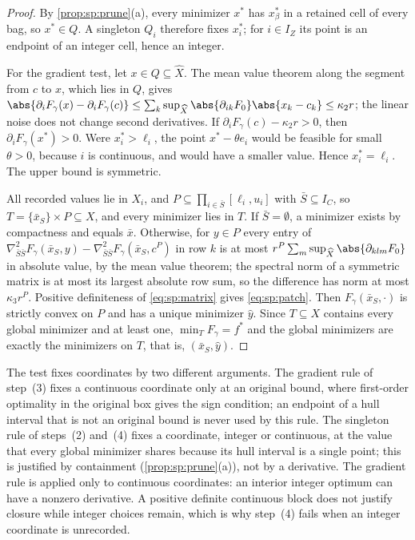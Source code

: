 \begin{proof}
By \cref{prop:sp:prune}(a), every minimizer $x^*$ has $x^*_\beta$ in a
retained cell of every bag, so $x^*\in Q$. A singleton $Q_i$ therefore fixes
$x_i^*$; for $i\in I_Z$ its point is an endpoint of an integer cell, hence an
integer.

For the gradient test, let $x\in Q\subseteq\widehat X$. The mean value
theorem along the segment from $c$ to $x$, which lies in $Q$, gives
$\abs{\partial_iF_\gamma(x)-\partial_iF_\gamma(c)}\le\sum_k\sup_{\widehat X}
\abs{\partial_{ik}F_0}\abs{x_k-c_k}\le\kappa_2r$; the linear noise does not
change second derivatives. If $\partial_iF_\gamma(c)-\kappa_2r>0$, then
$\partial_iF_\gamma(x^*)>0$. Were $x^*_i>\ell_i$, the point
$x^*-\theta e_i$ would be feasible for small $\theta>0$, because $i$ is
continuous, and would have a smaller value. Hence $x^*_i=\ell_i$. The upper
bound is symmetric.

All recorded values lie in $X_i$, and $P\subseteq\prod_{i\in\bar S}[\ell_i,u_i]$
with $\bar S\subseteq I_C$, so $T=\{\bar x_S\}\times P\subseteq X$, and every
minimizer lies in $T$. If $\bar S=\emptyset$, a minimizer exists by
compactness and equals $\bar x$. Otherwise, for $y\in P$ every entry of
$\nabla^2_{\bar S\bar S}F_\gamma(\bar x_S,y)-\nabla^2_{\bar S\bar S}F_\gamma(\bar x_S,c^P)$
in row $k$ is at most $r^P\sum_m\sup_{\widehat X}\abs{\partial_{klm}F_0}$ in
absolute value, by the mean value theorem; the spectral norm of a symmetric
matrix is at most its largest absolute row sum, so the difference has norm
at most $\kappa_3r^P$. Positive definiteness of \eqref{eq:sp:matrix} gives
\eqref{eq:sp:patch}. Then $F_\gamma(\bar x_S,\cdot)$ is strictly convex on
$P$ and has a unique minimizer $\hat y$. Since $T\subseteq X$ contains every
global minimizer and at least one, $\min_TF_\gamma=f^*$ and the global
minimizers are exactly the minimizers on $T$, that is, $(\bar x_S,\hat y)$.
\end{proof}

The test fixes coordinates by two different arguments. The gradient rule
of step~(3) fixes a continuous coordinate only at an original bound, where
first-order optimality in the original box gives the sign condition; an
endpoint of a hull interval that is not an original bound is never used by
this rule. The singleton rule of steps~(2) and~(4) fixes a coordinate,
integer or continuous, at the value that every global minimizer shares
because its hull interval is a single point; this is justified by
containment (\cref{prop:sp:prune}(a)), not by a derivative. The gradient
rule is applied only to continuous coordinates: an interior integer optimum
can have a nonzero derivative. A positive definite continuous block does not
justify closure while integer choices remain, which is why step~(4) fails
when an integer coordinate is unrecorded.

